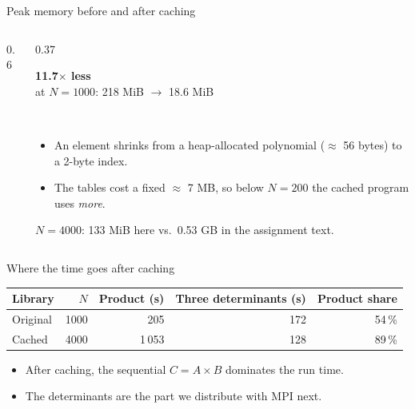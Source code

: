 \documentclass[aspectratio=169,11pt]{beamer}
\newcommand{\stat}[2]{%
  \begin{minipage}[t]{\linewidth}\centering
    {\Huge\bfseries\color{accent}#1}\\[0.3em]
    {\small\color{muted}#2}
  \end{minipage}}
\begin{document}
\begin{frame}{Peak memory before and after caching}
  \begin{columns}[c]
    \begin{column}{0.6\textwidth}
    \end{column}
    \begin{column}{0.37\textwidth}
      \stat{11.7$\times$ less}{at $N=1000$: 218 MiB $\rightarrow$ 18.6 MiB}
      \\[1em]
      \begin{itemize}\small
        \item An element shrinks from a heap-allocated polynomial
              ($\approx$ 56 bytes) to a 2-byte index.
        \item The tables cost a fixed $\approx$ 7 MB, so below $N=200$ the
              cached program uses \emph{more}.
      \end{itemize}
      {\scriptsize\color{muted}$N=4000$: 133 MiB here vs.\ 0.53 GB in the assignment text.}
    \end{column}
  \end{columns}
\end{frame}

\begin{frame}{Where the time goes after caching}
  \centering
  \begin{tabular}{@{}l r r r r@{}}
    \toprule
    Library & $N$ & Product (s) & Three determinants (s) & Product share \\
    \midrule
    Original & 1000 & 205   & 172 & 54\,\% \\
    Cached   & 4000 & 1\,053 & 128 & 89\,\% \\
    \bottomrule
  \end{tabular}
  \vspace{1.5em}
  \begin{itemize}
    \item After caching, the sequential $C = A\times B$ dominates the run time.
    \item The determinants are the part we distribute with MPI next.
  \end{itemize}
\end{frame}
\end{document}

